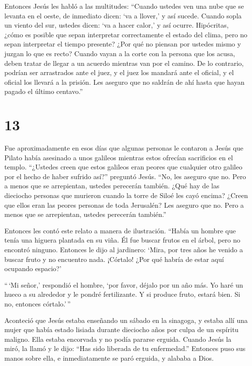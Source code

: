  Entonces Jesús les habló a las multitudes: ``Cuando
ustedes ven una nube que se levanta en el oeste, de inmediato dicen: `va
a llover,' y así sucede.  Cuando sopla un viento del sur,
ustedes dicen: `va a hacer calor,' y así ocurre. 
Hipócritas, ¿cómo es posible que sepan interpretar correctamente el
estado del clima, pero no sepan interpretar el tiempo presente?
 ¿Por qué no piensan por ustedes mismo y juzgan lo que es
recto?  Cuando vayan a la corte con la persona que los
acusa, deben tratar de llegar a un acuerdo mientras van por el camino.
De lo contrario, podrían ser arrastrados ante el juez, y el juez los
mandará ante el oficial, y el oficial los llevará a la prisión.
 Les aseguro que no saldrán de ahí hasta que hayan pagado
el último centavo.''

\hypertarget{section-12}{%
\section{13}\label{section-12}}

 Fue aproximadamente en esos días que algunas personas le
contaron a Jesús que Pilato había asesinado a unos galileos mientras
estos ofrecían sacrificios en el templo.  ``¿Ustedes creen
que estos galileos eran peores que cualquier otro galileo por el hecho
de haber sufrido así?'' preguntó Jesús.  ``No, les aseguro
que no. Pero a menos que se arrepientan, ustedes perecerán también.
 ¿Qué hay de las dieciocho personas que murieron cuando la
torre de Siloé les cayó encima? ¿Creen que ellos eran las peores
personas de toda Jerusalén?  Les aseguro que no. Pero a
menos que se arrepientan, ustedes perecerán también.''

 Entonces les contó este relato a manera de ilustración.
``Había un hombre que tenía una higuera plantada en su viña. Él fue
buscar frutos en el árbol, pero no encontró ninguno. 
Entonces le dijo al jardinero: `Mira, por tres años he venido a buscar
fruto y no encuentro nada. ¡Córtalo! ¿Por qué habría de estar aquí
ocupando espacio?'

 ``\,`Mi señor,' respondió el hombre, `por favor, déjalo por
un año más. Yo haré un hueco a su alrededor y le pondré fertilizante.
 Y si produce fruto, estará bien. Si no, entonces
córtalo.'\,''

 Aconteció que Jesús estaba enseñando un sábado en la
sinagoga,  y estaba allí una mujer que había estado lisiada
durante dieciocho años por culpa de un espíritu maligno. Ella estaba
encorvada y no podía pararse erguida.  Cuando Jesús la
miró, la llamó y le dijo: ``Has sido liberada de tu enfermedad.''
 Entonces puso sus manos sobre ella, e inmediatamente se
paró erguida, y alababa a Dios.

